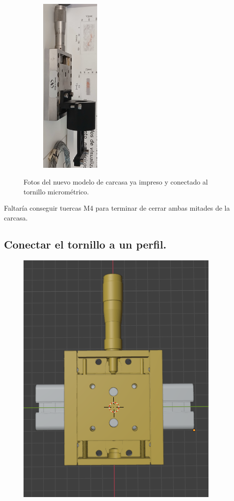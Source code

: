 \begin{figure}[!ht]
\begin{minipage}[c]{0.293054\textwidth}
			\begin{subfigure}{\textwidth}
				\centering
				\includegraphics[height=250pt]{Figures/21_04_2025/Vista_3_4_impresa.jpg}
				\captionsetup{width=0.8\textwidth}
			\end{subfigure}
		\end{minipage}
	\caption{Fotos del nuevo modelo de carcasa ya impreso y conectado al tornillo micrométrico.} %
	\label{fig:}
\end{figure}

Faltaría conseguir tuercas M4 para terminar de cerrar ambas mitades de la carcasa.

\subsection*{Conectar el tornillo a un perfil.}

\begin{figure}
	\centering
	\includegraphics[width=0.7\linewidth]{Figures/21_04_2025/Vista_frontal_tornillo_perfil}
	\caption{}
	\label{fig:vistafrontaltornilloperfil}
\end{figure}


